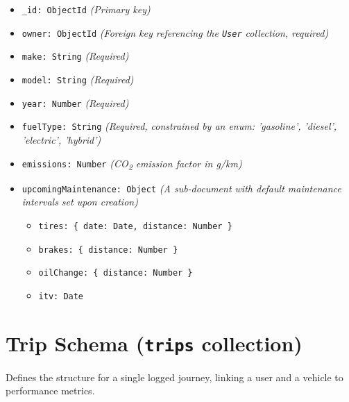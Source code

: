 \begin{itemize}
    \item \texttt{\_id: ObjectId} \textit{(Primary key)}
    \item \texttt{owner: ObjectId} \textit{(Foreign key referencing the \texttt{User} collection, required)}
    \item \texttt{make: String} \textit{(Required)}
    \item \texttt{model: String} \textit{(Required)}
    \item \texttt{year: Number} \textit{(Required)}
    \item \texttt{fuelType: String} \textit{(Required, constrained by an enum: 'gasoline', 'diesel', 'electric', 'hybrid')}
    \item \texttt{emissions: Number} \textit{(CO\textsubscript{2} emission factor in g/km)}
    \item \texttt{upcomingMaintenance: Object} \textit{(A sub-document with default maintenance intervals set upon creation)}
        \begin{itemize}
            \item \texttt{tires: \{ date: Date, distance: Number \}}
            \item \texttt{brakes: \{ distance: Number \}}
            \item \texttt{oilChange: \{ distance: Number \}}
            \item \texttt{itv: Date}
        \end{itemize}
\end{itemize}

\section{Trip Schema (\texttt{trips} collection)}
Defines the structure for a single logged journey, linking a user and a vehicle to performance metrics.

